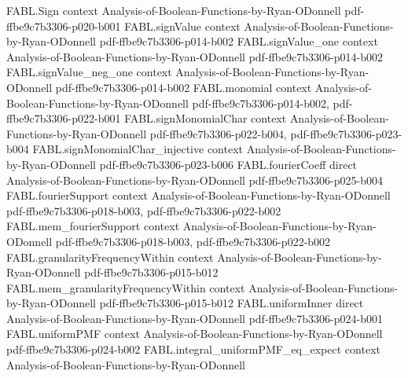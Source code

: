 \begin{theorem}
\label{FABL.productNoiseOperator_uniformSign_eq_noiseOperator}
\leanok
{}
\proofstep
  {FABL.Sign}
  {context}
  {Analysis-of-Boolean-Functions-by-Ryan-ODonnell}
  {pdf-ffbe9c7b3306-p020-b001}
\proofstep
  {FABL.signValue}
  {context}
  {Analysis-of-Boolean-Functions-by-Ryan-ODonnell}
  {pdf-ffbe9c7b3306-p014-b002}
\proofstep
  {FABL.signValue_one}
  {context}
  {Analysis-of-Boolean-Functions-by-Ryan-ODonnell}
  {pdf-ffbe9c7b3306-p014-b002}
\proofstep
  {FABL.signValue_neg_one}
  {context}
  {Analysis-of-Boolean-Functions-by-Ryan-ODonnell}
  {pdf-ffbe9c7b3306-p014-b002}
\proofstep
  {FABL.monomial}
  {context}
  {Analysis-of-Boolean-Functions-by-Ryan-ODonnell}
  {pdf-ffbe9c7b3306-p014-b002,
    pdf-ffbe9c7b3306-p022-b001}
\proofstep
  {FABL.signMonomialChar}
  {context}
  {Analysis-of-Boolean-Functions-by-Ryan-ODonnell}
  {pdf-ffbe9c7b3306-p022-b004,
    pdf-ffbe9c7b3306-p023-b004}
\proofstep
  {FABL.signMonomialChar_injective}
  {context}
  {Analysis-of-Boolean-Functions-by-Ryan-ODonnell}
  {pdf-ffbe9c7b3306-p023-b006}
\proofstep
  {FABL.fourierCoeff}
  {direct}
  {Analysis-of-Boolean-Functions-by-Ryan-ODonnell}
  {pdf-ffbe9c7b3306-p025-b004}
\proofstep
  {FABL.fourierSupport}
  {context}
  {Analysis-of-Boolean-Functions-by-Ryan-ODonnell}
  {pdf-ffbe9c7b3306-p018-b003,
    pdf-ffbe9c7b3306-p022-b002}
\proofstep
  {FABL.mem_fourierSupport}
  {context}
  {Analysis-of-Boolean-Functions-by-Ryan-ODonnell}
  {pdf-ffbe9c7b3306-p018-b003,
    pdf-ffbe9c7b3306-p022-b002}
\proofstep
  {FABL.granularityFrequencyWithin}
  {context}
  {Analysis-of-Boolean-Functions-by-Ryan-ODonnell}
  {pdf-ffbe9c7b3306-p015-b012}
\proofstep
  {FABL.mem_granularityFrequencyWithin}
  {context}
  {Analysis-of-Boolean-Functions-by-Ryan-ODonnell}
  {pdf-ffbe9c7b3306-p015-b012}
\proofstep
  {FABL.uniformInner}
  {direct}
  {Analysis-of-Boolean-Functions-by-Ryan-ODonnell}
  {pdf-ffbe9c7b3306-p024-b001}
\proofstep
  {FABL.uniformPMF}
  {context}
  {Analysis-of-Boolean-Functions-by-Ryan-ODonnell}
  {pdf-ffbe9c7b3306-p024-b002}
\proofstep
  {FABL.integral_uniformPMF_eq_expect}
  {context}
  {Analysis-of-Boolean-Functions-by-Ryan-ODonnell}

\end{theorem}
